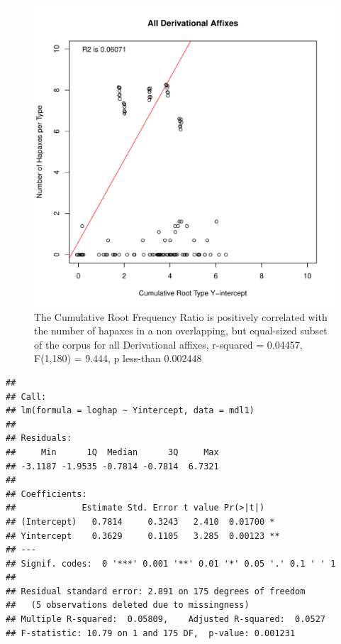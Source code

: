 \documentclass[12pt]{article}\usepackage[]{graphicx}\usepackage[]{color}
\makeatletter
\def\maxwidth{ %
  \ifdim\Gin@nat@width>\linewidth
    \linewidth
  \else
    \Gin@nat@width
  \fi
}
\newenvironment{kframe}{%
 \def\at@end@of@kframe{}%
 \ifinner\ifhmode%
  \def\at@end@of@kframe{\end{minipage}}%
  \begin{minipage}{\columnwidth}%
 \fi\fi%
 \def\FrameCommand##1{\hskip\@totalleftmargin \hskip-\fboxsep
 \colorbox{shadecolor}{##1}\hskip-\fboxsep
     \hskip-\linewidth \hskip-\@totalleftmargin \hskip\columnwidth}%
 \MakeFramed {\advance\hsize-\width
   \@totalleftmargin\z@ \linewidth\hsize
   \@setminipage}}%
 {\par\unskip\endMakeFramed%
 \at@end@of@kframe}
\newenvironment{knitrout}{}{} %
\makeatother
\begin{document}
\begin{knitrout}
\color{fgcolor}\begin{figure}
\includegraphics[width=\maxwidth]{figure/HapaxDataDerivationYintercept-1} \caption[The Cumulative Root Frequency Ratio is positively correlated with the number of hapaxes in a non overlapping, but equal-sized subset of the corpus for all Derivational affixes, r-squared = 0.04457, F(1,180) = 9.444, p less-than 0.002448]{The Cumulative Root Frequency Ratio is positively correlated with the number of hapaxes in a non overlapping, but equal-sized subset of the corpus for all Derivational affixes, r-squared = 0.04457, F(1,180) = 9.444, p less-than 0.002448}\label{fig:HapaxDataDerivationYintercept}
\end{figure}

\begin{kframe}\begin{verbatim}
## 
## Call:
## lm(formula = loghap ~ Yintercept, data = mdl1)
## 
## Residuals:
##     Min      1Q  Median      3Q     Max 
## -3.1187 -1.9535 -0.7814 -0.7814  6.7321 
## 
## Coefficients:
##             Estimate Std. Error t value Pr(>|t|)   
## (Intercept)   0.7814     0.3243   2.410  0.01700 * 
## Yintercept    0.3629     0.1105   3.285  0.00123 **
## ---
## Signif. codes:  0 '***' 0.001 '**' 0.01 '*' 0.05 '.' 0.1 ' ' 1
## 
## Residual standard error: 2.891 on 175 degrees of freedom
##   (5 observations deleted due to missingness)
## Multiple R-squared:  0.05809,	Adjusted R-squared:  0.0527 
## F-statistic: 10.79 on 1 and 175 DF,  p-value: 0.001231
\end{verbatim}
\end{kframe}
\end{knitrout}
\end{document}
